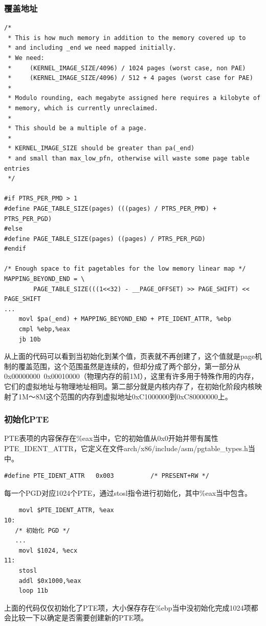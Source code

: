 \documentclass[b5paper,9pt,twoside,openany]{article}
\begin{document}
\subsubsection{覆盖地址}
\begin{lstlisting}
/*
 * This is how much memory in addition to the memory covered up to
 * and including _end we need mapped initially.
 * We need:
 *     (KERNEL_IMAGE_SIZE/4096) / 1024 pages (worst case, non PAE)
 *     (KERNEL_IMAGE_SIZE/4096) / 512 + 4 pages (worst case for PAE)
 *
 * Modulo rounding, each megabyte assigned here requires a kilobyte of
 * memory, which is currently unreclaimed.
 *
 * This should be a multiple of a page.
 *
 * KERNEL_IMAGE_SIZE should be greater than pa(_end)
 * and small than max_low_pfn, otherwise will waste some page table entries
 */

#if PTRS_PER_PMD > 1
#define PAGE_TABLE_SIZE(pages) (((pages) / PTRS_PER_PMD) + PTRS_PER_PGD)
#else
#define PAGE_TABLE_SIZE(pages) ((pages) / PTRS_PER_PGD)
#endif

/* Enough space to fit pagetables for the low memory linear map */
MAPPING_BEYOND_END = \
        PAGE_TABLE_SIZE(((1<<32) - __PAGE_OFFSET) >> PAGE_SHIFT) << PAGE_SHIFT
... 
    movl $pa(_end) + MAPPING_BEYOND_END + PTE_IDENT_ATTR, %ebp
    cmpl %ebp,%eax
    jb 10b
\end{lstlisting}
从上面的代码可以看到当初始化到某个值，页表就不再创建了，这个值就是page机制的覆盖范围，这个范围虽然是连续的，但却分成了两个部分，第一部分从0x00000000~0x00010000（物理内存的前1M），这里有许多用于特殊作用的内存，它们的虚拟地址与物理地址相同。第二部分就是内核内存了，在初始化阶段内核映射了1M～8M这个范围的内存到虚拟地址0xC1000000到0xC80000000上。

\subsubsection{初始化PTE}
PTE表项的内容保存在\%eax当中，它的初始值从0x0开始并带有属性PTE\_IDENT\_ATTR，它定义在文件arch/x86/include/asm/pgtable\_types.h当中。
\begin{lstlisting}
#define PTE_IDENT_ATTR   0x003          /* PRESENT+RW */
\end{lstlisting}

每一个PGD对应1024个PTE，通过stosl指令进行初始化，其中\%eax当中包含。
\begin{lstlisting}
    movl $PTE_IDENT_ATTR, %eax
10:
   /* 初始化 PGD */
   ...
    movl $1024, %ecx
11:
    stosl
    addl $0x1000,%eax
    loop 11b
\end{lstlisting}
上面的代码仅仅初始化了PTE项，大小保存存在\%ebp当中没初始化完成1024项都会比较一下以确定是否需要创建新的PTE项。
\end{document}
